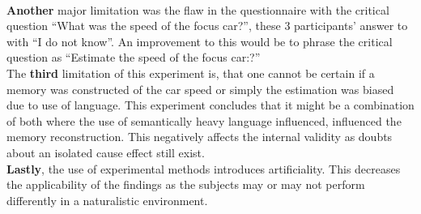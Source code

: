 \documentclass[11pt]{article}
\begin{document}
\\
\textbf{Another} major limitation was the flaw in the questionnaire with the critical question ``What was the speed of the focus car?'', these 3 participants' answer to with ``I do not know''. An improvement to this would be to phrase the 
critical question as ``Estimate the speed of the focus car:?''
\\
The \textbf{third} limitation of this experiment is, that one cannot be certain if a memory was constructed of the car speed or simply the estimation was biased due to use of language. This experiment concludes that it might be a combination of both
where the use of semantically heavy language influenced, influenced the memory reconstruction. This negatively affects the internal validity as doubts about an isolated cause effect still exist.
\\
\textbf{Lastly}, the use of experimental methods introduces artificiality. This decreases the applicability of the findings as the subjects may or may not perform differently in a naturalistic environment. 


\printbibliography{}
\end{document}
